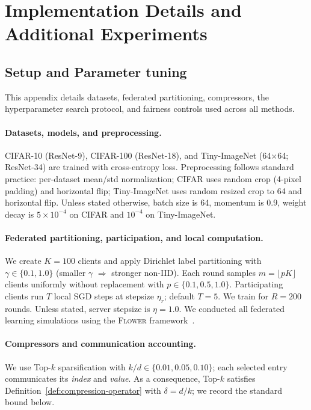 \documentclass{article} %
\begin{document}
\section{Implementation Details and Additional Experiments}
\subsection{Setup and Parameter tuning}
This appendix details datasets, federated partitioning, compressors, the hyperparameter search protocol, and fairness controls used across all methods.

\paragraph{Datasets, models, and preprocessing.}
{CIFAR-10 (ResNet-9)}, {CIFAR-100 (ResNet-18)}, and {Tiny-ImageNet} (64$\times$64; {ResNet-34}) are trained with cross-entropy loss.
Preprocessing follows standard practice: per-dataset mean/std normalization; CIFAR uses random crop (4-pixel padding) and horizontal flip; Tiny-ImageNet uses random resized crop to 64 and horizontal flip. Unless stated otherwise, batch size is 64, momentum is 0.9, weight decay is $5\!\times\!10^{-4}$ on CIFAR and $10^{-4}$ on Tiny-ImageNet.

\paragraph{Federated partitioning, participation, and local computation.}
We create $K{=}100$ clients and apply Dirichlet label partitioning with $\gamma\in\{0.1,1.0\}$ (smaller $\gamma$ $\Rightarrow$ stronger non-IID).
Each round samples $m=\lfloor pK\rfloor$ clients uniformly without replacement with $p\in\{0.1,0.5,1.0\}$.
Participating clients run $T$ local SGD steps at stepsize $\eta_r$; default $T{=}5$. We train for $R{=}200$ rounds.
Unless stated, server stepsize is $\eta{=}1.0$. We conducted all federated learning simulations using the \textsc{Flower} framework~\citep{beutel2020flower}.

\paragraph{Compressors and communication accounting.}
We use Top-$k$ sparsification with $k/d\in\{0.01,0.05,0.10\}$; each selected entry communicates its \emph{index} and \emph{value}. As a consequence, Top-$k$ satisfies Definition~\ref{def:compression-operator} with $\delta=d/k$; we record the standard bound below.
\end{document}
